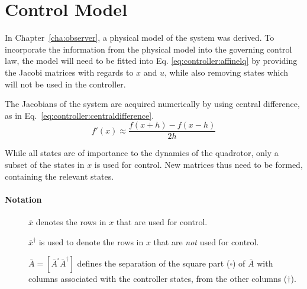 \section{Control Model}
\label{sec:controller:model}
    In Chapter~\ref{cha:observer}, a physical model of the system
    was derived. To incorporate the information from the physical model
    into the governing control law, the model will need to be fitted into Eq.
    \eqref{eq:controller:affinelq} by providing the Jacobi matrices with
    regards to $x$ and $u$, while also removing states which will not be
    used in the controller.

    The Jacobians of the system are acquired numerically by using
    central difference, as in Eq.~\eqref{eq:controller:centraldifference}.
    \begin{equation}
    \label{eq:controller:centraldifference}
        f'(x) \approx \frac{f(x+h) - f(x-h)}{2h}
    \end{equation}

    While all states are of importance to the dynamics of the quadrotor,
    only a subset of the states in $x$ is used for control.
    New matrices thus need to be formed, containing the relevant states.
    \paragraph{Notation}
    \begin{description}
        \item[] $\bar{x}$ denotes the rows in $x$ that are used for control.
        \item[] $\bar{x}^{\dagger}$ is used to denote the rows in $x$ that are \textit{not} used for control.
        \item[] $\bar{A} = [ \bar{A}^{\square} \bar{A}^{\dagger}]$
        defines the separation of the square part ($\square$) of $\bar{A}$ with columns
        associated with the controller states, from the other columns ($\dagger$).
    \end{description}

